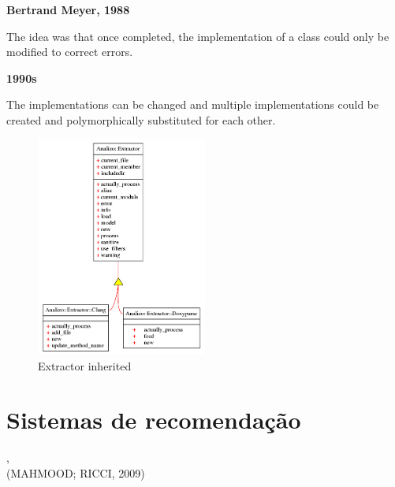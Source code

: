 \begin{frame}


\begin{Parallel}[v]{5cm}{5cm}
    \ParallelLText%
    {
    	\textbf{Bertrand Meyer, 1988}

    	The idea was that once completed, the implementation of a class could only be modified to correct errors.
    }
    \ParallelRText%
    {
    	\textbf{1990s}

    	The implementations can be changed and multiple implementations could be created and polymorphically substituted for each other.
	}
\end{Parallel}

\end{frame}

\begin{frame}

\begin{figure}[h!]
  \centering
    \includegraphics[width=0.5\textwidth]{conteudo/Extractor}
    \caption{Extractor inherited}
\end{figure}

\end{frame}



\section{Sistemas de recomendação} %
\label{sec:sistemas_recomendacao}
\begin{frame}
    ,\\(MAHMOOD; RICCI, 2009)
\end{frame}

